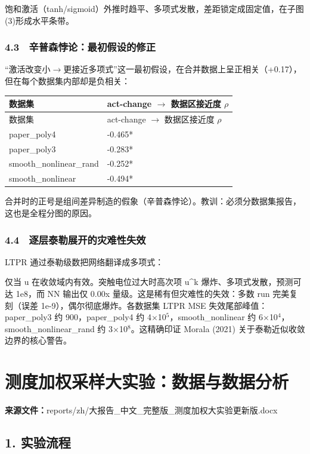 \documentclass[UTF8,a4paper,11pt]{ctexart}
\begin{document}
饱和激活（tanh/sigmoid）外推时趋平、多项式发散，差距锁定成固定值，在子图(3)形成水平条带。

\subsubsection{4.3　辛普森悖论：最初假设的修正}

“激活改变小$\to$更接近多项式”这一最初假设，在合并数据上呈正相关（+0.17），但在每个数据集内部却是负相关：

\begin{longtable}{p{}p{}}
\toprule
数据集 & act-change $\to$ 数据区接近度 $\rho$ \\
\midrule
\endfirsthead
\toprule
数据集 & act-change $\to$ 数据区接近度 $\rho$ \\
\midrule
\endhead
paper\_poly4 & -0.465* \\
paper\_poly3 & -0.283* \\
smooth\_nonlinear\_rand & -0.252* \\
smooth\_nonlinear & -0.494* \\
\bottomrule
\end{longtable}

合并时的正号是组间差异制造的假象（辛普森悖论）。教训：必须分数据集报告，这也是全程分图的原因。

\subsubsection{4.4　逐层泰勒展开的灾难性失效}

LTPR 通过泰勒级数把网络翻译成多项式：

仅当 u 在收敛域内有效。突触电位过大时高次项 u\textasciicircum{}k 爆炸、多项式发散，预测可达 1e8，而 NN 输出仅 0.00x 量级。这是稀有但灾难性的失效：多数 run 完美复刻（误差 1e-9），偶尔彻底爆炸。各数据集 LTPR MSE 失效尾部峰值：paper\_poly3 约 900，paper\_poly4 约 4$\times$10$^5$，smooth\_nonlinear 约 6$\times$10$^4$，smooth\_nonlinear\_rand 约 3$\times$10$^8$。这精确印证 Morala (2021) 关于泰勒近似收敛边界的核心警告。

\section{测度加权采样大实验：数据与数据分析}
\noindent\textbf{来源文件：}reports/zh/大报告\_中文\_完整版\_测度加权大实验更新版.docx

\subsection{1. 实验流程}
\end{document}
